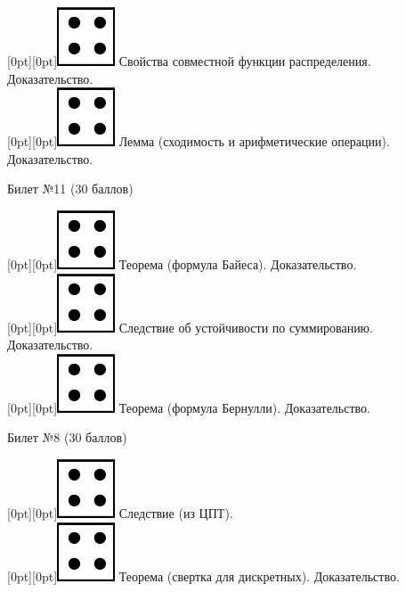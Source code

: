 \documentclass[10pt]{article}
\begin{document}
\raisebox{-1pt}[0pt][0pt]{\includegraphics[width=0.02\linewidth]{4.png}} Свойства совместной функции распределения. Доказательство. \\

\raisebox{-1pt}[0pt][0pt]{\includegraphics[width=0.02\linewidth]{4.png}} Лемма (сходимость и арифметические операции). Доказательство. \\

\begin{center} {\Large Билет №11 (30 баллов)} \end{center}

\raisebox{-1pt}[0pt][0pt]{\includegraphics[width=0.02\linewidth]{4.png}} Теорема (формула Байеса). Доказательство. \\

\raisebox{-1pt}[0pt][0pt]{\includegraphics[width=0.02\linewidth]{4.png}} Следствие об устойчивости по суммированию. Доказательство. \\

\raisebox{-1pt}[0pt][0pt]{\includegraphics[width=0.02\linewidth]{4.png}} Теорема (формула Бернулли). Доказательство. \\

\begin{center} {\Large Билет №8 (30 баллов)} \end{center}

\raisebox{-1pt}[0pt][0pt]{\includegraphics[width=0.02\linewidth]{4.png}} Следствие (из ЦПТ). \\

\raisebox{-1pt}[0pt][0pt]{\includegraphics[width=0.02\linewidth]{4.png}} Теорема (свертка для дискретных).  Доказательство. \\
\end{document}
